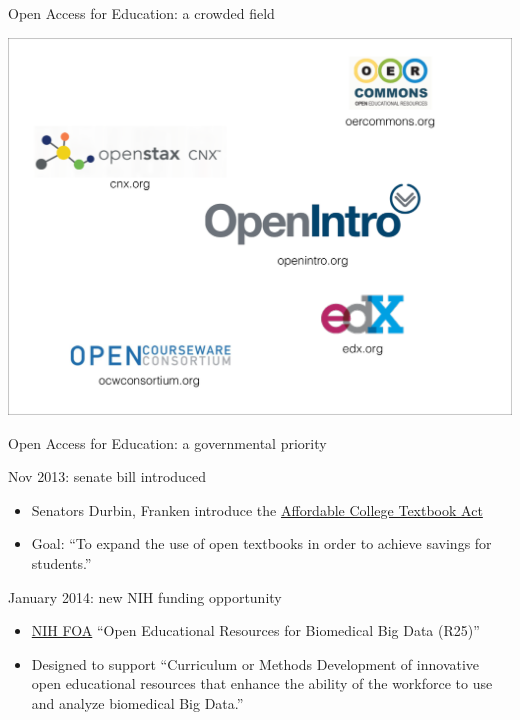 
\begin{frame}{Open Access for Education: a crowded field}

\includegraphics[width=\linewidth]{openEdLogos}

\end{frame}


\begin{frame}{Open Access for Education: a governmental priority}

\begin{block}{Nov 2013: senate bill introduced}
\begin{itemize}
\item Senators Durbin, Franken introduce the \href{http://thomas.loc.gov/cgi-bin/query/z?c113:S.1704:}{Affordable College Textbook Act}
\item Goal: ``To expand the use of open textbooks in order to achieve savings for students.''
\end{itemize}
\end{block}

\begin{block}{January 2014: new NIH funding opportunity}
\begin{itemize}
\item \href{http://grants.nih.gov/grants/guide/rfa-files/RFA-HG-14-009.html}{NIH FOA} ``Open Educational Resources for Biomedical Big Data (R25)''
\item Designed to support ``Curriculum or Methods Development of innovative open educational resources that enhance the ability of the workforce to use and analyze biomedical Big Data.''
\end{itemize}
\end{block}

\end{frame}



